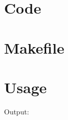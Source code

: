 \documentclass[12pt, a4paper]{article}
\begin{document}
\begin{scriptsize}
\begin{ttfamily}

\end{ttfamily}
\end{scriptsize}

\section{Code}

\begin{scriptsize}
\begin{ttfamily}

\end{ttfamily}
\end{scriptsize}

\section{Makefile}

\begin{scriptsize}
\begin{ttfamily}

\end{ttfamily}
\end{scriptsize}

\section{Usage}

\begin{scriptsize}
\begin{ttfamily}

\end{ttfamily}
\end{scriptsize}

Output:\\
\begin{scriptsize}
\begin{ttfamily}

\end{ttfamily}
\end{scriptsize}
\end{document}
